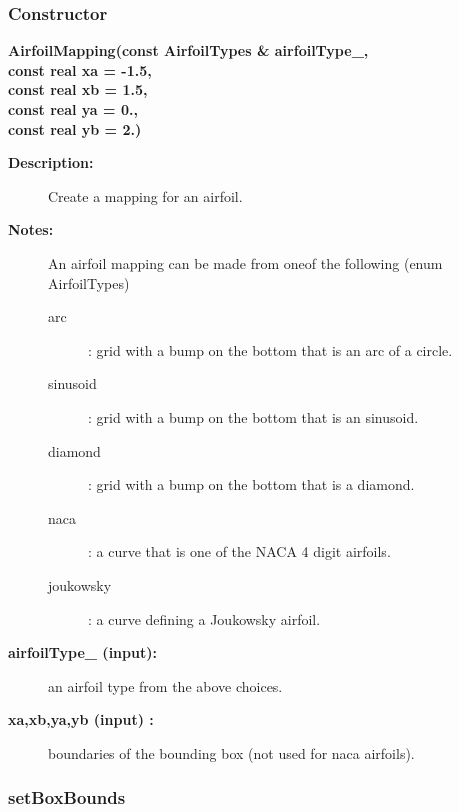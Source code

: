 \subsubsection{Constructor}
 
\newlength{\AirfoilMappingIncludeArgIndent}
\begin{flushleft} \textbf{%
\settowidth{\AirfoilMappingIncludeArgIndent}{AirfoilMapping(}%
AirfoilMapping(const AirfoilTypes \& airfoilType\_, \\ 
\hspace{\AirfoilMappingIncludeArgIndent}const real xa  = -1.5, \\ 
\hspace{\AirfoilMappingIncludeArgIndent}const real xb  = 1.5, \\ 
\hspace{\AirfoilMappingIncludeArgIndent}const real ya  = 0., \\ 
\hspace{\AirfoilMappingIncludeArgIndent}const real yb  = 2.) 
}\end{flushleft}
\begin{description}
\item[{\bf Description:}] 
    Create a mapping for an airfoil.
\item[{\bf Notes:}]  An airfoil mapping can be made from oneof the following (enum AirfoilTypes)
  \begin{description}
   \item[arc] : grid with a bump on the bottom that is an arc of a circle.
   \item[sinusoid] : grid with a bump on the bottom that is an sinusoid.
   \item[diamond] : grid with a bump on the bottom that is a diamond.
   \item[naca] : a curve that is one of the NACA 4 digit airfoils.
   \item[joukowsky] : a curve defining a Joukowsky airfoil.
  \end{description}
\item[{\bf airfoilType\_ (input):}]  an airfoil type from the above choices.
\item[{\bf xa,xb,ya,yb (input) :}]  boundaries of the bounding box (not used for naca airfoils).
\end{description}
\subsubsection{setBoxBounds}
 
